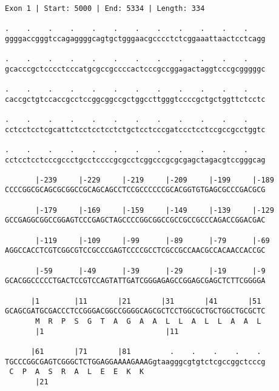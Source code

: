 \documentclass{article}
\begin{document}
 \begin{Verbatim}
 
Exon 1 | Start: 5000 | End: 5334 | Length: 334
 
.    .    .    .    .    .    .    .    .    .    .    .    
ggggaccgggtccagaggggcagtgctgggaacgcccctctcggaaattaactcctcagg
                                                            
.    .    .    .    .    .    .    .    .    .    .    .    
gcacccgctcccctcccatgcgccgccccactcccgccggagactaggtcccgcgggggc
                                                            
.    .    .    .    .    .    .    .    .    .    .    .    
caccgctgtccaccgcctccggcggccgctggccttgggtccccgctgctggttctcctc
                                                            
.    .    .    .    .    .    .    .    .    .    .    .    
cctcctcctcgcattctcctcctcctctgctcctcccgatccctcctccgccgcctggtc
                                                            
.    .    .    .    .    .    .    .    .    .    .    .    
cctcctcctcccgccctgcctccccgcgcctcggcccgcgcgagctagacgtccgggcag
                                                            
       |-239     |-229     |-219     |-209     |-199     |-189
CCCCGGCGCAGCGCGGCCGCAGCAGCCTCCGCCCCCCGCACGGTGTGAGCGCCCGACGCG
                                                            
       |-179     |-169     |-159     |-149     |-139     |-129
GCCGAGGCGGCCGGAGTCCCGAGCTAGCCCCGGCGGCCGCCGCCGCCCAGACCGGACGAC
                                                            
       |-119     |-109     |-99      |-89      |-79      |-69
AGGCCACCTCGTCGGCGTCCGCCCGAGTCCCCGCCTCGCCGCCAACGCCACAACCACCGC
                                                            
       |-59      |-49      |-39      |-29      |-19      |-9
GCACGGCCCCCTGACTCCGTCCAGTATTGATCGGGAGAGCCGGAGCGAGCTCTTCGGGGA
                                                            
      |1        |11       |21       |31       |41       |51 
GCAGCGATGCGACCCTCCGGGACGGCCGGGGCAGCGCTCCTGGCGCTGCTGGCTGCGCTC
       M  R  P  S  G  T  A  G  A  A  L  L  A  L  L  A  A  L 
       |1                            |11                    
  
      |61       |71       |81         .    .    .    .    . 
TGCCCGGCGAGTCGGGCTCTGGAGGAAAAGAAAGgtaagggcgtgtctcgccggctcccg
 C  P  A  S  R  A  L  E  E  K  K                            
       |21                                                  
  

\end{Verbatim}
\end{document}
